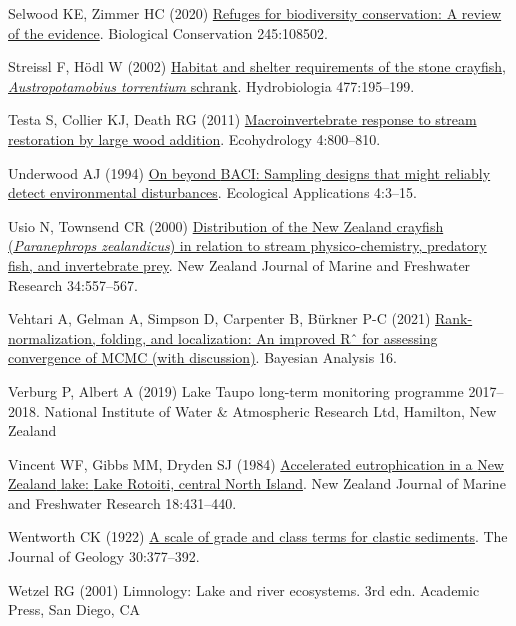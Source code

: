 \documentclass[
  letterpaper,
  DIV=11,
  numbers=noendperiod]{scrartcl}
\newlength{\cslhangindent}
\newenvironment{CSLReferences}[2] %
 {\begin{list}{}{%
  \setlength{\itemindent}{0pt}
  \setlength{\leftmargin}{0pt}
  \setlength{\parsep}{0pt}
  \ifodd #1
   \setlength{\leftmargin}{\cslhangindent}
   \setlength{\itemindent}{-1\cslhangindent}
  \fi
  \setlength{\itemsep}{#2\baselineskip}}}
 {\end{list}}
\begin{document}
\begin{CSLReferences}{1}{1}
Selwood KE, Zimmer HC (2020)
\href{https://doi.org/10.1016/j.biocon.2020.108502}{Refuges for
biodiversity conservation: A review of the evidence}. Biological
Conservation 245:108502.

Streissl F, Hödl W (2002)
\href{https://doi.org/10.1023/A:1021094309738}{Habitat and shelter
requirements of the stone crayfish, {\emph{Austropotamobius torrentium}}
schrank}. Hydrobiologia 477:195--199.

Testa S, Collier KJ, Death RG (2011)
\href{https://doi.org/10.1002/eco.146}{Macroinvertebrate response to
stream restoration by large wood addition}. Ecohydrology 4:800--810.

Underwood AJ (1994) \href{https://doi.org/10.2307/1942110}{On beyond
{BACI}: Sampling designs that might reliably detect environmental
disturbances}. Ecological Applications 4:3--15.

Usio N, Townsend CR (2000)
\href{https://doi.org/10.1080/00288330.2000.9516957}{Distribution of the
{New Zealand} crayfish ({\emph{Paranephrops zealandicus}}) in relation
to stream physico-chemistry, predatory fish, and invertebrate prey}. New
Zealand Journal of Marine and Freshwater Research 34:557--567.

Vehtari A, Gelman A, Simpson D, Carpenter B, Bürkner P-C (2021)
\href{https://doi.org/10.1214/20-ba1221}{Rank-normalization, folding,
and localization: An improved Rˆ for assessing convergence of MCMC (with
discussion)}. Bayesian Analysis 16.

Verburg P, Albert A (2019) {Lake Taupo} long-term monitoring programme
2017--2018. National Institute of Water \& Atmospheric Research Ltd,
Hamilton, New Zealand

Vincent WF, Gibbs MM, Dryden SJ (1984)
\href{https://doi.org/10.1080/00288330.1984.9516064}{Accelerated
eutrophication in a {New Zealand} lake: {Lake Rotoiti}, central {North
Island}}. New Zealand Journal of Marine and Freshwater Research
18:431--440.

Wentworth CK (1922) \href{https://doi.org/10.1086/622910}{A scale of
grade and class terms for clastic sediments}. The Journal of Geology
30:377--392.

Wetzel RG (2001) Limnology: Lake and river ecosystems. 3rd edn. Academic
Press, San Diego, CA


\end{CSLReferences}
\end{document}
